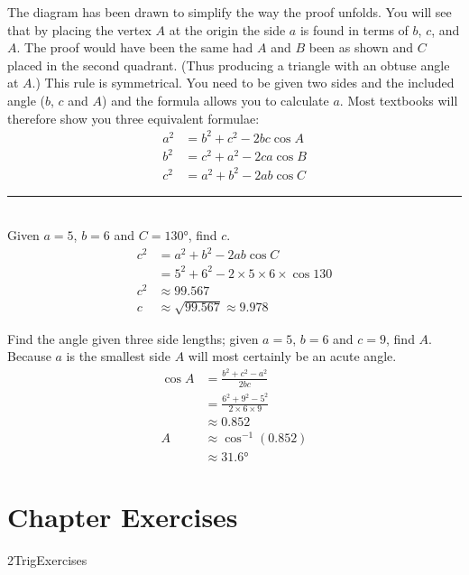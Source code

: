 The diagram has been drawn to simplify the way the proof unfolds. You will see that by placing the vertex $A$ at the origin the side $a$ is found in terms of $b$, $c$, and $A$. The proof would have been the same had $A$ and $B$ been as shown and $C$ placed in the second quadrant. (Thus producing a triangle with an obtuse angle at $A$.) This rule is symmetrical. You need to be given two sides and the included angle ($b$, $c$ and $A$) and the formula allows you to calculate $a$. Most textbooks will therefore show you three equivalent formulae:
\begin{align*}a^{2} &  = b^{2} +c^{2} -2 b c \cos  A \\
b^{2} &  = c^{2} +a^{2} -2 c a \cos  B \\
c^{2} &  = a^{2} +b^{2} -2 a b \cos  C\end{align*}
\rule{6.8cm}{0.5pt}\\
\example Given $a =5$, $b =6$ and $C =\ang{130} $, find $c$.\medskip\\
\solution
\begin{align*}c^{2} &  = a^{2} +b^{2} -2 a b \cos  C \\
&  = 5^{2} +6^{2} -2 \times 5 \times 6 \times \cos  130  \\
c^2&  \approx   99.567 \\
c &  \approx   \sqrt{99.567}  \approx   9.978\end{align*}

\example Find the angle given three side lengths; given $a =5$, $b =6$ and $c =9$, find $A$. \medskip\\
\solution Because $a$ is the smallest side $A$ will most certainly be an acute angle.
\begin{align*}\cos  A &  = \frac{b^{2} +c^{2} -a^{2}}{2 b c} \\
&  = \frac{6^{2} +9^{2} -5^{2}}{2 \times 6 \times 9} \\
&  \approx 0.852 \\
A &  \approx \cos ^{ -1} \left (0.852\right ) \\
&  \approx \ang{31.6} 
\end{align*}

\section{Chapter Exercises}
{2TrigExercises}

